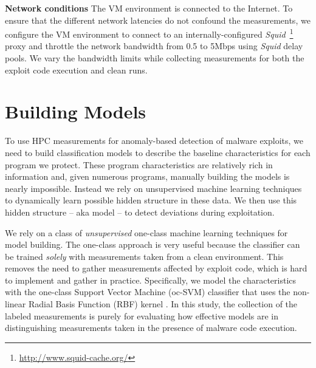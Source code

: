 \documentclass{acm_proc_article-sp}
\begin{document}
\textbf{Network conditions} \space\space The VM environment is
connected to the Internet. To ensure that the different network
latencies do not confound the measurements, we configure the VM
environment to connect to an internally-configured
\textit{Squid}~\footnote{\url{http://www.squid-cache.org/}} proxy 
and throttle the network bandwidth from 0.5 to 5Mbps using \textit{Squid} delay pools. We vary 
the bandwidth limits while collecting measurements for both the exploit 
code execution and clean runs.


\section{Building Models}
\label{sec:models}

To use HPC measurements for anomaly-based detection
of malware exploits, we need to build classification models to
describe the baseline characteristics for each program we
protect. These program characteristics are relatively rich in
information and, given numerous programs, manually building the 
models is nearly impossible.  Instead we rely on unsupervised machine
learning techniques to dynamically learn possible hidden structure
in these data. We then use this hidden structure -- aka model --
to detect deviations during exploitation.



We rely on a class of \textit{unsupervised} one-class machine
learning techniques for model building. The one-class approach is
very useful because the classifier can be trained \emph{solely}
with measurements taken from a clean environment. This removes  
the need to gather measurements affected by exploit code, which
is hard to implement and gather in practice. Specifically, we model the characteristics with the one-class Support Vector Machine (oc-SVM) classifier that uses the non-linear Radial Basis Function (RBF) kernel
\cite{Scholkopf:2001:ESH:1119748.1119749}. In this study, the
collection of the labeled measurements is purely for evaluating how
effective models are in distinguishing measurements taken in the
presence of malware code execution.
\end{document}
